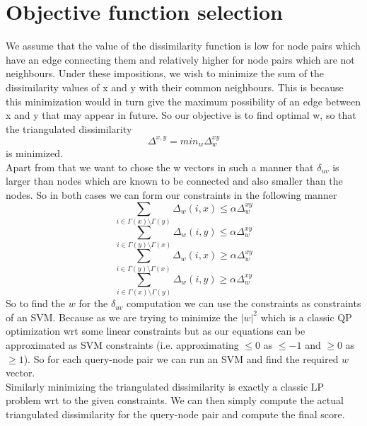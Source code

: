 \documentclass{article}
\begin{document}
\section*{Objective function selection}
We assume that the value of the dissimilarity function is low for node pairs which have an edge connecting them and relatively higher for node pairs which are not neighbours. Under these impositions, we wish to minimize the sum of the dissimilarity values of x and y with their common neighbours. This is because this minimization would in turn give the maximum possibility of an edge between x and y that may appear in future. So our objective is to find optimal w, so that the triangulated dissimilarity
\begin{equation}
\Delta^{x,y} = min_{w} \Delta_{w}^{xy}
\end{equation}
is minimized.
\\
Apart from that we want to chose the w vectors in such a manner that $\delta_{uv}$ is larger than nodes which are known to be connected and also smaller than the nodes. So in both cases we can form our constraints in the following manner
\begin{equation}
\sum_{i \in \Gamma(x) \setminus \Gamma(y)} \Delta_{w} (i,x) \leq \alpha \Delta_{w}^{xy}
\end{equation}
\begin{equation}
\sum_{i \in \Gamma(y) \setminus \Gamma(x)} \Delta_{w} (i,y) \leq \alpha \Delta_{w}^{xy}
\end{equation}
\begin{equation}
\sum_{i \in \Gamma(y) \setminus \Gamma(x)} \Delta_{w} (i,x) \geq \alpha \Delta_{w}^{xy}
\end{equation}
\begin{equation}
\sum_{i \in \Gamma(x) \setminus \Gamma(y)} \Delta_{w} (i,y) \geq \alpha \Delta_{w}^{xy}
\end{equation}
So to find the $w$ for the $\delta_{uv}$ computation we can use the constraints as constraints of an SVM. Because as we are trying to minimize the $|w|^2$ which is a classic QP optimization wrt some linear constraints but as our equations can be approximated as SVM constraints (i.e. approximating $ \leq 0$ as $\leq -1$ and $\geq 0$ as $\geq 1$). So for each query-node pair we can run an SVM and find the required $w$ vector.
\\
Similarly minimizing the triangulated dissimilarity is exactly a classic LP problem wrt to the given constraints. We can then simply compute the actual triangulated dissimilarity for the query-node pair and compute the final score.
\end{document}

